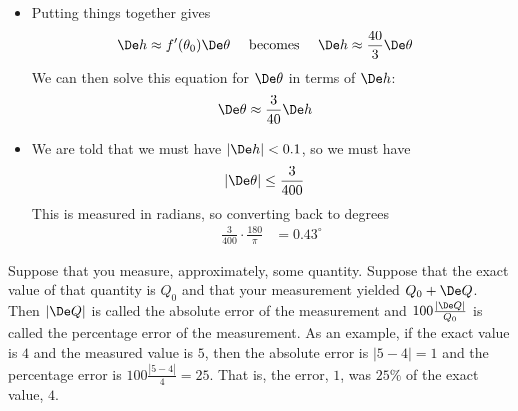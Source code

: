 \begin{eg}
\begin{itemize}
\item Putting things together gives
\begin{align*}
  \De h &\approx f'(\theta_0) \De \theta & \text{ becomes }&&
  \De h & \approx \frac{40}{3} \De \theta
\end{align*}
We can then solve this equation for $\De\theta$ in terms of $\De h$:
\begin{align*}
  \De \theta & \approx \frac{3}{40} \De h
\end{align*}

\item We are told that we must have $|\De h| < 0.1$, so we must have
\begin{align*}
  |\De \theta| &\leq \frac{3}{400}
\end{align*}
This is measured in radians, so converting back to degrees
\begin{align*}
  \frac{3}{400} \cdot \frac{180}{\pi} &= 0.43^\circ
\end{align*}

\end{itemize}

\end{eg}
\goodbreak

\begin{defn}\label{def:APPrelError} %
    Suppose that you measure, approximately, some quantity.
    Suppose that the exact value of that quantity is $Q_0$
    and that your measurement yielded $Q_0+\De Q$. Then
    $|\De Q|$ is called the absolute error of the measurement
    and $100\frac{|\De Q|}{Q_0}$ is called the percentage error
    of the measurement. As an example, if the exact
    value is $4$ and the measured value is $5$, then the absolute
    error is $|5-4|=1$ and the percentage error is
    $100\frac{|5-4|}{4}=25$. That is, the error, $1$, was $25\%$
    of the exact value, $4$.
\end{defn}


